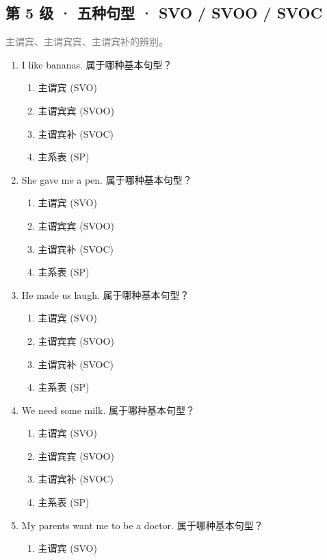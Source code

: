 \documentclass[11pt,a4paper]{ctexart}
\begin{document}
\subsection*{第 5 级 · 五种句型 · SVO / SVOO / SVOC}
\noindent\textcolor{gray}{主谓宾、主谓宾宾、主谓宾补的辨别。}\par\smallskip
\begin{enumerate}[leftmargin=*,itemsep=4pt]
\item I like bananas. 属于哪种基本句型？
\begin{enumerate}[label=\Alph*.,leftmargin=2em,itemsep=1pt,topsep=2pt]
\item 主谓宾 (SVO)
\item 主谓宾宾 (SVOO)
\item 主谓宾补 (SVOC)
\item 主系表 (SP)
\end{enumerate}
\item She gave me a pen. 属于哪种基本句型？
\begin{enumerate}[label=\Alph*.,leftmargin=2em,itemsep=1pt,topsep=2pt]
\item 主谓宾 (SVO)
\item 主谓宾宾 (SVOO)
\item 主谓宾补 (SVOC)
\item 主系表 (SP)
\end{enumerate}
\item He made us laugh. 属于哪种基本句型？
\begin{enumerate}[label=\Alph*.,leftmargin=2em,itemsep=1pt,topsep=2pt]
\item 主谓宾 (SVO)
\item 主谓宾宾 (SVOO)
\item 主谓宾补 (SVOC)
\item 主系表 (SP)
\end{enumerate}
\item We need some milk. 属于哪种基本句型？
\begin{enumerate}[label=\Alph*.,leftmargin=2em,itemsep=1pt,topsep=2pt]
\item 主谓宾 (SVO)
\item 主谓宾宾 (SVOO)
\item 主谓宾补 (SVOC)
\item 主系表 (SP)
\end{enumerate}
\item My parents want me to be a doctor. 属于哪种基本句型？
\begin{enumerate}[label=\Alph*.,leftmargin=2em,itemsep=1pt,topsep=2pt]
\item 主谓宾 (SVO)

\end{enumerate}
\end{enumerate}
\end{document}
